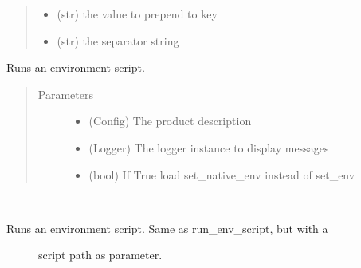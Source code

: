\documentclass[a4paper,10pt,english]{sphinxmanual}
\begin{document}
\begin{fulllineitems}
\begin{fulllineitems}
\begin{quote}
\begin{description}
\begin{itemize}
\item {} 
 \textendash{} (str) the value to prepend to key

\item {} 
 \textendash{} (str) the separator string

\end{itemize}

\end{description}\end{quote}

\end{fulllineitems}


\begin{fulllineitems}
\label{\detokenize{apidoc_src/src:src.environment.SalomeEnviron.run_env_script}}
Runs an environment script.
\begin{quote}\begin{description}
\item[{Parameters}] \leavevmode\begin{itemize}
\item {} 
 \textendash{} (Config) The product description

\item {} 
 \textendash{} (Logger) The logger instance to display messages

\item {} 
 \textendash{} (bool) If True load set\_native\_env instead of set\_env

\end{itemize}

\end{description}\end{quote}

\end{fulllineitems}


\begin{fulllineitems}
\label{\detokenize{apidoc_src/src:src.environment.SalomeEnviron.run_simple_env_script}}~\begin{description}
\item[{Runs an environment script. Same as run\_env\_script, but with a }] \leavevmode
script path as parameter.


\end{description}
\end{fulllineitems}
\end{fulllineitems}
\end{document}
